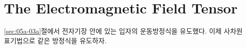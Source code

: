 \section{The Electromagnetic Field Tensor}
\label{sec:05a-09a}

\ref{sec:05a-03a}절에서 전자기장 안에 있는 입자의 운동방정식을 유도했다. 이제 사차원 표기법으로 같은 방정식을 유도하자.

